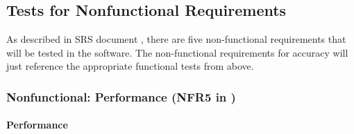 \documentclass[12pt, titlepage]{article}
\begin{document}
\subsection{Tests for Nonfunctional Requirements}

As described in \progname{} SRS document \citet{SRS}, there are five non-functional requirements
that will be tested in the software. The non-functional requirements for accuracy will just reference the
appropriate functional tests from above.







\subsubsection{Nonfunctional: Performance (NFR5 in \citet{SRS})}
		
\paragraph{Performance}
\end{document}
